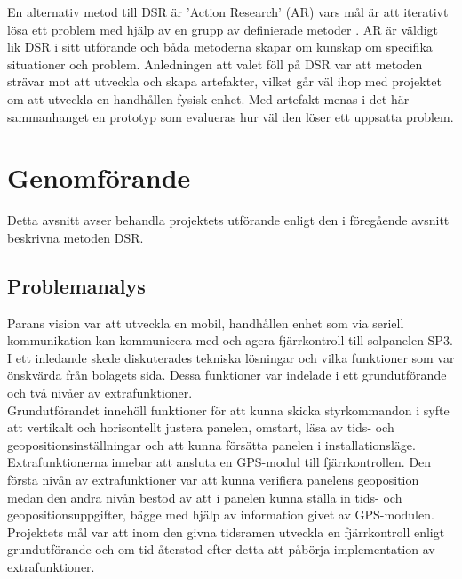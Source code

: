 \documentclass{article}
\begin{document}
        \noindent En alternativ metod till DSR är 'Action Research' (AR) vars mål är att iterativt lösa ett problem med hjälp av en grupp av definierade metoder \cite{actionresearch}. AR är väldigt lik DSR i sitt utförande \cite{designscience} och båda metoderna skapar om kunskap om specifika situationer och problem. Anledningen att valet föll på DSR var att metoden strävar mot att utveckla och skapa artefakter, vilket går väl ihop med projektet om att utveckla en handhållen fysisk enhet. 
        Med artefakt menas i det här sammanhanget en prototyp som evalueras hur väl den löser ett uppsatta problem. 

    \newpage

    \section{Genomförande} %
    \label{sec:genomforande}
        Detta avsnitt avser behandla projektets utförande enligt den i föregående avsnitt beskrivna metoden DSR.
        
        \subsection{Problemanalys} %
        \label{sub:problemanalys}
            Parans vision var att utveckla en mobil, handhållen enhet som via seriell kommunikation kan kommunicera med och agera fjärrkontroll till solpanelen SP3.  I ett inledande skede diskuterades tekniska lösningar och vilka funktioner som var önskvärda från bolagets sida. Dessa funktioner var indelade i ett grundutförande och två nivåer av extrafunktioner. \\
            
            \noindent Grundutförandet innehöll funktioner för att kunna skicka styrkommandon i syfte att vertikalt och horisontellt justera panelen, omstart, läsa av tids- och geopositionsinställningar och att kunna försätta panelen i installationsläge. \\
            
            \noindent Extrafunktionerna innebar att ansluta en GPS-modul till fjärrkontrollen. Den första nivån av extrafunktioner var att kunna verifiera panelens geoposition medan den andra nivån bestod av att i panelen kunna ställa in tids- och geopositionsuppgifter, bägge med hjälp av information givet av GPS-modulen. Projektets mål var att inom den givna tidsramen utveckla en fjärrkontroll enligt grundutförande och om tid återstod efter detta att påbörja implementation av extrafunktioner.
\end{document}
